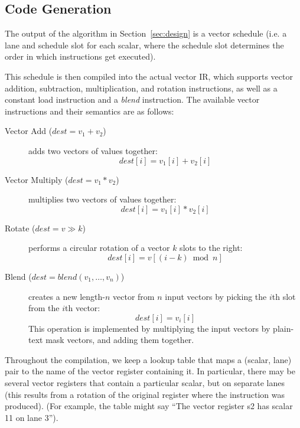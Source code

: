 \subsection{Code Generation}\label{sec:codegen}
The output of the algorithm in Section~\ref{sec:design} is a vector schedule (i.e. a lane and schedule slot for each scalar, where the schedule slot determines the order in which instructions get executed).

This schedule is then compiled into the actual vector IR, which supports vector addition, subtraction, multiplication, and rotation instructions, as well as a constant load instruction and a {\em blend} instruction. The available vector instructions and their semantics are as follows:
\begin{description}
    \item[Vector Add ($dest = v_1 + v_2$)] adds two vectors of values together: $$dest[i] = v_1[i] + v_2[i]$$
    \item[Vector Multiply ($dest = v_1 * v_2$)] multiplies two vectors of values together: $$dest[i] = v_1[i] * v_2[i]$$
    \item[Rotate ($dest = v \gg k$)] performs a circular rotation of a vector $k$ slots to the right: $$dest[i] = v[(i - k)\bmod n]$$ %
    \item[Blend ($dest = blend(v_1, \dots, v_n)$)] creates a new length-$n$ vector from $n$ input vectors by picking the $i$th slot from the $i$th vector: $$dest[i] = v_i[i]$$
    This operation is implemented by multiplying the input vectors by plain-text mask vectors, and adding them together.
\end{description}



Throughout the compilation, we keep a lookup table that maps a (scalar, lane) pair to the name of the vector register containing it.
In particular, there may be several vector registers that contain a particular scalar, but on separate lanes (this results from a rotation of the original register where the instruction was produced).
(For example, the table might say ``The vector register {\sf s2} has scalar 11 on lane 3'').

